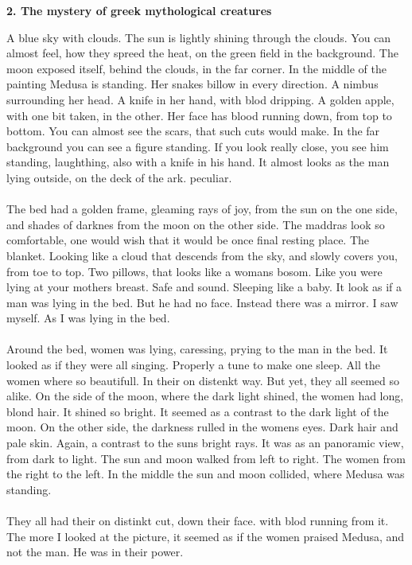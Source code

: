 \documentclass[]{article}
\begin{document}
\begin{center}
	\large\textbf{2. The mystery of greek mythological creatures}
\end{center}

A blue sky with clouds. The sun is lightly shining through the clouds. You can almost feel, how they spreed the heat, on the green field in the background. The moon exposed itself, behind the clouds, in the far corner. In the middle of the painting Medusa is standing. Her snakes billow in every direction. A nimbus surrounding her head. A knife in her hand, with blod dripping. A golden apple, with one bit taken, in the other. Her face has blood running down, from top to bottom. You can almost see the scars, that such cuts would make. In the far background you can see a figure standing. If you look really close, you see him standing, laughthing, also with a knife in his hand. It almost looks as the man lying outside, on the deck of the ark. peculiar.
\\ \\
The bed had a golden frame, gleaming rays of joy, from the sun on the one side, and shades of darknes from the moon on the other side. The maddras look so comfortable, one would wish that it would be once final resting place. The blanket. Looking like a cloud that descends from the sky, and slowly covers you, from toe to top. Two pillows, that looks like a womans bosom. Like you were lying at your mothers breast. Safe and sound. Sleeping like a baby. It look as if a man was lying in the bed. But he had no face. Instead there was a mirror. I saw myself. As I was lying in the bed.
\\ \\
Around the bed, women was lying, caressing, prying to the man in the bed. It looked as if they were all singing. Properly a tune to make one sleep. All the women where so beautifull. In their on distenkt way. But yet, they all seemed so alike. On the side of the moon, where the dark light shined, the women had long, blond hair. It shined so bright. It seemed as a contrast to the dark light of the moon. On the other side, the darkness rulled in the womens eyes. Dark hair and pale skin. Again, a contrast to the suns bright rays. It was as an panoramic view, from dark to light. The sun and moon walked from left to right. The women from the right to the left. In the middle the sun and moon collided, where Medusa was standing. 
\\ \\
They all had their on distinkt cut, down their face. with blod running from it. The more I looked at the picture, it seemed as if the women praised Medusa, and not the man. He was in their power. 
\end{document}
